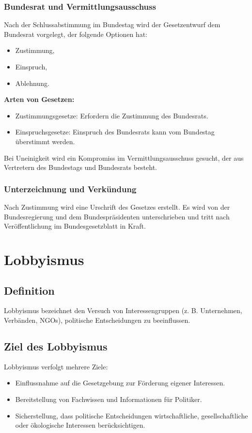 \documentclass[a4paper,10pt]{article}
\begin{document}
\subsubsection{Bundesrat und Vermittlungsausschuss}
Nach der Schlussabstimmung im Bundestag wird der Gesetzentwurf dem Bundesrat vorgelegt, der folgende Optionen hat:
\begin{itemize}
    \item Zustimmung,
    \item Einspruch,
    \item Ablehnung.
\end{itemize}

\textbf{Arten von Gesetzen:}
\begin{itemize}
    \item Zustimmungsgesetze: Erfordern die Zustimmung des Bundesrats.
    \item Einspruchsgesetze: Einspruch des Bundesrats kann vom Bundestag überstimmt werden.
\end{itemize}

Bei Uneinigkeit wird ein Kompromiss im Vermittlungsausschuss gesucht, der aus Vertretern des Bundestags und Bundesrats besteht.

\subsubsection{Unterzeichnung und Verkündung}
Nach Zustimmung wird eine Urschrift des Gesetzes erstellt. Es wird von der Bundesregierung und dem Bundespräsidenten unterschrieben und tritt nach Veröffentlichung im Bundesgesetzblatt in Kraft.
\clearpage

\section{Lobbyismus}

\subsection{Definition}
Lobbyismus bezeichnet den Versuch von Interessengruppen (z. B. Unternehmen, Verbänden, NGOs), politische Entscheidungen zu beeinflussen.

\subsection{Ziel des Lobbyismus}
Lobbyismus verfolgt mehrere Ziele:
\begin{itemize}
    \item Einflussnahme auf die Gesetzgebung zur Förderung eigener Interessen.
    \item Bereitstellung von Fachwissen und Informationen für Politiker.
    \item Sicherstellung, dass politische Entscheidungen wirtschaftliche, gesellschaftliche oder ökologische Interessen berücksichtigen.
\end{itemize}
\end{document}
